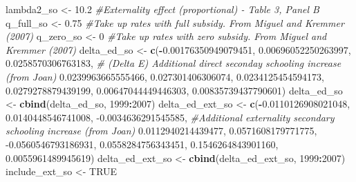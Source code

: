 \documentclass[]{article}
\newenvironment{Shaded}{\begin{snugshade}}{\end{snugshade}}
\newcommand{\CommentTok}[1]{\textcolor[rgb]{0.56,0.35,0.01}{\textit{#1}}}
\newcommand{\DecValTok}[1]{\textcolor[rgb]{0.00,0.00,0.81}{#1}}
\newcommand{\FloatTok}[1]{\textcolor[rgb]{0.00,0.00,0.81}{#1}}
\newcommand{\KeywordTok}[1]{\textcolor[rgb]{0.13,0.29,0.53}{\textbf{#1}}}
\newcommand{\NormalTok}[1]{#1}
\newcommand{\OperatorTok}[1]{\textcolor[rgb]{0.81,0.36,0.00}{\textbf{#1}}}
\newcommand{\OtherTok}[1]{\textcolor[rgb]{0.56,0.35,0.01}{#1}}
\newcommand{\StringTok}[1]{\textcolor[rgb]{0.31,0.60,0.02}{#1}}
\begin{document}
\begin{Shaded}
\begin{Highlighting}[]
\NormalTok{    lambda2_so <-}\StringTok{ }\FloatTok{10.2}             \CommentTok{#Externality effect (proportional) - Table 3, Panel B}
\NormalTok{    q_full_so <-}\StringTok{ }\FloatTok{0.75}              \CommentTok{#Take up rates with full subsidy. From Miguel and Kremmer (2007)}
\NormalTok{    q_zero_so <-}\StringTok{ }\DecValTok{0}                 \CommentTok{#Take up rates with zero subsidy. From Miguel and Kremmer (2007)}
\NormalTok{    delta_ed_so <-}\StringTok{ }\KeywordTok{c}\NormalTok{(}\OperatorTok{-}\FloatTok{0.00176350949079451}\NormalTok{, }\FloatTok{0.00696052250263997}\NormalTok{, }\FloatTok{0.0258570306763183}\NormalTok{,     }\CommentTok{# (Delta E) Additional direct seconday schooling increase (from Joan)}
                        \FloatTok{0.0239963665555466}\NormalTok{, }\FloatTok{0.027301406306074}\NormalTok{, }\FloatTok{0.0234125454594173}\NormalTok{,}
                       \FloatTok{0.0279278879439199}\NormalTok{, }\FloatTok{0.00647044449446303}\NormalTok{, }\FloatTok{0.00835739437790601}\NormalTok{)                                     }
\NormalTok{    delta_ed_so <-}\StringTok{ }\KeywordTok{cbind}\NormalTok{(delta_ed_so, }\DecValTok{1999}\OperatorTok{:}\DecValTok{2007}\NormalTok{)}
\NormalTok{    delta_ed_ext_so <-}\StringTok{ }\KeywordTok{c}\NormalTok{(}\OperatorTok{-}\FloatTok{0.0110126908021048}\NormalTok{,   }\FloatTok{0.0140448546741008}\NormalTok{, }\FloatTok{-0.0034636291545585}\NormalTok{,  }\CommentTok{#Additional externality secondary schooling increase (from Joan)}
                           \FloatTok{0.0112940214439477}\NormalTok{,  }\FloatTok{0.0571608179771775}\NormalTok{, }\FloatTok{-0.0560546793186931}\NormalTok{,}
                           \FloatTok{0.0558284756343451}\NormalTok{,  }\FloatTok{0.1546264843901160}\NormalTok{, }\FloatTok{0.0055961489945619}\NormalTok{)}
\NormalTok{    delta_ed_ext_so <-}\StringTok{ }\KeywordTok{cbind}\NormalTok{(delta_ed_ext_so, }\DecValTok{1999}\OperatorTok{:}\DecValTok{2007}\NormalTok{)    }
\NormalTok{    include_ext_so <-}\StringTok{ }\OtherTok{TRUE}
    

\end{Highlighting}
\end{Shaded}
\end{document}
